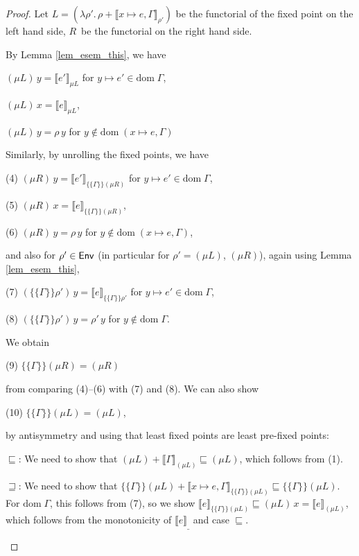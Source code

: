 \documentclass{jfp1}
\theoremstyle{nonumberbreak}
\newtheorem{proof}{Proof}
\newcommand{\sEnv}   {\text{\textsf{Env}}}
\newcommand{\dom}[1]{\text{dom}\;#1}
\newcommand{\dsem}[2]{\llbracket #1 \rrbracket_{#2}}
\newcommand{\esem}[1]{\{\!\!\!\{#1\}\!\!\!\}}
\newcommand{\upd}[1]{\mathop{++_{#1}}}
\begin{document}
\begin{proof}
\newcommand{\domxG}{\dom{(x\mapsto e,\Gamma)}}
Let $L = (\lambda \rho'.\, \rho \upd{\domxG} \dsem{x\mapsto e, \Gamma}{\rho'})$ be the functorial of the fixed point on the left hand side, $R$~be the functorial on the right hand side.

By Lemma \ref{lem_esem_this}, we have
\begin{compactenum}[(1)]
\item $(\mu L)\, y = \dsem{e'}{\mu L}$ for $y\mapsto e'\in\dom\Gamma$,
\item $(\mu L)\, x = \dsem{e}{\mu L}$,
\item $(\mu L)\, y = \rho\, y$ for $y \notin \domxG$
\end{compactenum}
Similarly, by unrolling the fixed points, we have
\begin{compactenum}[(1)]
\item[(4)] $(\mu R)\, y = \dsem{e'}{\esem{\Gamma}{(\mu R)}}$ for $y \mapsto e'\in\dom\Gamma$,
\item[(5)] $(\mu R)\, x = \dsem{e}{\esem{\Gamma}{(\mu R)}}$,
\item[(6)] $(\mu R)\, y = \rho\, y$ for $y \notin \domxG$,
\end{compactenum}
and also for $\rho' \in \sEnv$ (in particular for $\rho' = (\mu L)$, $(\mu R)$), again using Lemma \ref{lem_esem_this},
\begin{compactenum}[(1)]
\item[(7)] $(\esem{\Gamma}{\rho'})\,y = \dsem{e}{\esem{\Gamma}{\rho'}}$ for $y \mapsto e' \in \dom\Gamma$,
\item[(8)] $(\esem{\Gamma}{\rho'})\,y = \rho'\, y$ for $y \notin \dom\Gamma$.
\end{compactenum}

\medskip
We obtain
\begin{compactenum}[(1)]
\item[(9)] $\esem{\Gamma}{(\mu R)} = (\mu R)$
\end{compactenum}
from comparing (4)--(6) with (7) and (8). We can also show
\begin{compactenum}[(1)]
\item[(10)] $\esem{\Gamma}{(\mu L)} = (\mu L)$,
\end{compactenum}
by antisymmetry and using that least fixed points are least pre-fixed points:
\begin{compactitem}[$\sqsubseteq$:]
\item[$\sqsubseteq$:] We need to show that $(\mu L) \upd{\dom\Gamma} \dsem{\Gamma}{(\mu L)} \sqsubseteq (\mu L)$, which follows from (1). 
\item[$\sqsupseteq$:] We need to show that $\esem{\Gamma}{(\mu L)} \upd{\domxG} \dsem{x\mapsto e, \Gamma}{\esem{\Gamma}{(\mu L)}} \sqsubseteq \esem{\Gamma}{(\mu L)}$. For $\dom\Gamma$, this follows from (7), so we show $\dsem{e}{\esem{\Gamma}{(\mu L)}} \sqsubseteq (\mu L)\, x = \dsem{e}{(\mu L)}$, which follows from the monotonicity of $\dsem{e}{\_}$ and case $\sqsubseteq$.
\end{compactitem}


\end{proof}
\end{document}
